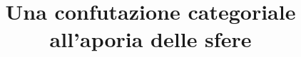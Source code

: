 \documentclass[a4paper]{../birkjour}
\title{Una confutazione categoriale all'aporia delle sfere}
\begin{document}

\maketitle

{\footnotesize\tableofcontents}





{}

\end{document}
